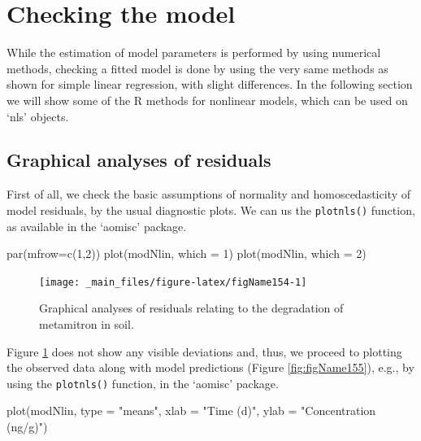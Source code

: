 \documentclass[a4paper,12pt,oneside]{book}
\newenvironment{Shaded}{\begin{snugshade}}{\end{snugshade}}
\newcommand{\DecValTok}[1]{#1}
\newcommand{\StringTok}[1]{#1}
\newcommand{\FunctionTok}[1]{#1}
\newcommand{\AttributeTok}[1]{#1}
\newcommand{\NormalTok}[1]{#1}
\begin{document}
\hypertarget{checking-the-model}{%
\section{Checking the model}\label{checking-the-model}}

While the estimation of model parameters is performed by using numerical methods, checking a fitted model is done by using the very same methods as shown for simple linear regression, with slight differences. In the following section we will show some of the R methods for nonlinear models, which can be used on `nls' objects.

\hypertarget{graphical-analyses-of-residuals}{%
\subsection{Graphical analyses of residuals}\label{graphical-analyses-of-residuals}}

First of all, we check the basic assumptions of normality and homoscedasticity of model residuals, by the usual diagnostic plots. We can us the \texttt{plotnls()} function, as available in the `aomisc' package.

\begin{Shaded}
\begin{Highlighting}[]
\FunctionTok{par}\NormalTok{(}\AttributeTok{mfrow=}\FunctionTok{c}\NormalTok{(}\DecValTok{1}\NormalTok{,}\DecValTok{2}\NormalTok{))}
\FunctionTok{plot}\NormalTok{(modNlin, }\AttributeTok{which =} \DecValTok{1}\NormalTok{)}
\FunctionTok{plot}\NormalTok{(modNlin, }\AttributeTok{which =} \DecValTok{2}\NormalTok{)}
\end{Highlighting}
\end{Shaded}

\begin{figure}

{\centering \texttt{[image: \_main\_files/figure-latex/figName154-1]} 

}

\caption{Graphical analyses of residuals relating to the degradation of metamitron in soil.}\label{fig:figName154}
\end{figure}

Figure \ref{fig:figName154} does not show any visible deviations and, thus, we proceed to plotting the observed data along with model predictions (Figure \ref{fig:figName155}), e.g., by using the \texttt{plotnls()} function, in the `aomisc' package.

\begin{Shaded}
\begin{Highlighting}[]
\FunctionTok{plot}\NormalTok{(modNlin, }\AttributeTok{type =} \StringTok{"means"}\NormalTok{,}
        \AttributeTok{xlab =} \StringTok{"Time (d)"}\NormalTok{, }\AttributeTok{ylab =} \StringTok{"Concentration (ng/g)"}\NormalTok{)}
\end{Highlighting}
\end{Shaded}
\end{document}
